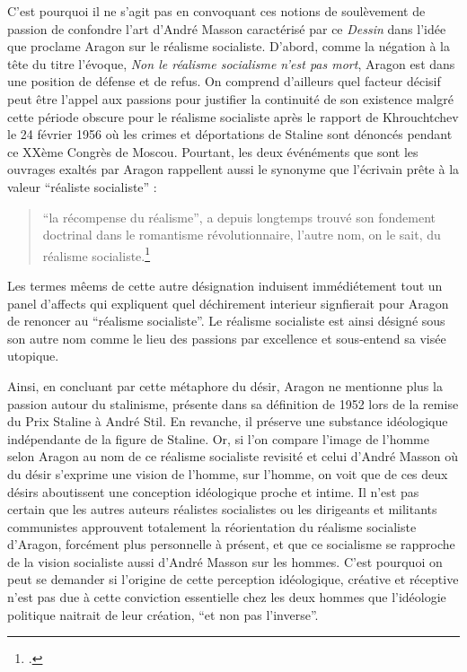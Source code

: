 C’est pourquoi il ne s’agit pas en convoquant ces notions de soulèvement de passion de confondre l’art d’André Masson caractérisé par ce \emph{Dessin} dans l’idée que proclame Aragon sur le réalisme socialiste. D’abord, comme la négation à la tête du titre l’évoque, \emph{Non le réalisme socialisme n’est pas mort}, Aragon est dans une position de défense et de refus. On comprend d’ailleurs quel facteur décisif peut être l’appel aux passions pour justifier la continuité de son existence malgré cette période obscure pour le réalisme socialiste après le rapport de Khrouchtchev le 24 février 1956 où les crimes et déportations de Staline sont dénoncés pendant ce XXème Congrès de Moscou. Pourtant, les deux événéments que sont les ouvrages exaltés par Aragon rappellent aussi le synonyme que l'écrivain prête à la valeur \enquote{réaliste socialiste} :  

\begin{quote}
\enquote{la récompense du réalisme}, a depuis longtemps trouvé son fondement doctrinal dans le romantisme révolutionnaire, l'autre nom, on le sait, du réalisme socialiste.\footcite[p1012]{these}\end{quote}

Les termes mêems de cette autre désignation induisent immédiétement tout un panel d'affects qui expliquent quel déchirement interieur signfierait pour Aragon de renoncer au \enquote{réalisme socialiste}. Le réalisme socialiste est ainsi désigné sous son autre nom comme le lieu des passions par excellence et sous-entend sa visée utopique. 


	 Ainsi, en concluant par cette métaphore du désir, Aragon ne mentionne plus la passion autour du stalinisme, présente dans sa définition de 1952 lors de la remise du Prix Staline à André Stil. En revanche, il préserve une substance idéologique indépendante de la figure de Staline. Or, si l’on compare l’image de l’homme selon Aragon au nom de ce réalisme socialiste revisité et celui d’André Masson où du désir s’exprime une vision de l’homme, sur l’homme, on voit que de ces deux désirs aboutissent une conception idéologique proche et intime. Il n’est pas certain que les autres auteurs réalistes socialistes ou les dirigeants et militants communistes approuvent totalement la réorientation du réalisme socialiste d’Aragon, forcément plus personnelle à présent, et que ce socialisme se rapproche de la vision socialiste aussi d’André Masson sur les hommes. C’est pourquoi on peut se demander si l’origine de cette perception idéologique, créative et réceptive n’est pas due à cette conviction essentielle chez les deux hommes que l’idéologie politique naitrait de leur création, \enquote{et non pas l’inverse}. 

